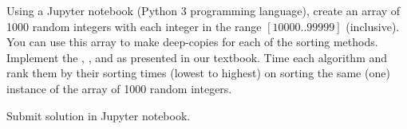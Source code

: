 \documentclass[addpoints,11pt]{exam}
\begin{document}
\begin{questions}
		
		
		\question[30]
		Using a Jupyter notebook (Python 3 programming language), create an array of 1000 random integers with each integer in the range $[10000..99999]$ (inclusive).  You can use this array to make deep-copies for each of the sorting methods.  Implement the , , and  as presented in our textbook.  Time each algorithm and rank them by their sorting times (lowest to highest) on sorting the same (one) instance of the array of 1000 random integers.
		
		\begin{solutionorbox}
			Submit solution in Jupyter notebook.
		\end{solutionorbox}
		
		\ifprintanswers
		\newpage
		\else
		\bigskip
		\fi
		
		
		
	\end{questions}
\end{document}
